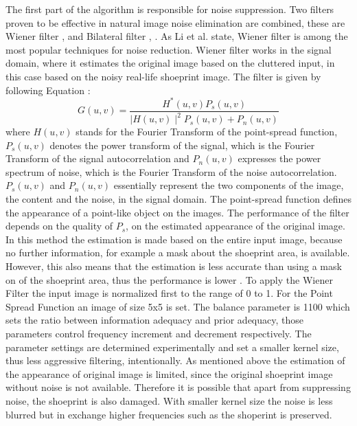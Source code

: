 \documentclass[draft,final]{vutinfth} %
\begin{document}
\par
The first part of the algorithm is responsible for noise suppression.
Two filters proven to be effective in natural image noise elimination are combined, these are Wiener filter \cite{li2014rapid}, \cite{chatterjee2011patch} and Bilateral filter \cite{zhang2016simultaneous}, \cite{huang2013self}.
As Li et al. \cite{li2014rapid} state, Wiener filter is among the most popular techniques for noise reduction.
Wiener filter works in the signal domain, where it estimates the original image based on the cluttered input, in this case based on the noisy real-life shoeprint image. 
The filter is given by following Equation \cite{Win}:
\begin{equation}
G(u, v) = \frac{H^*(u,v) P_s(u, v)}{\mid H(u,v)\mid ^2 P_s (u, v) + P_n (u, v)}  
\end{equation}
where $H(u,v)$ stands for the Fourier Transform of the point-spread function, $P_s (u,v)$ denotes the power transform of the signal, which is the Fourier Transform of the signal autocorrelation and $P_n(u,v)$ expresses the power spectrum of noise, which is the Fourier Transform of the noise autocorrelation.
 $P_s(u,v)$ and  $P_n(u,v)$ essentially represent the two components of the image, the content and the noise, in the signal domain.
The point-spread function defines the appearance of a point-like object on the images.
The performance of the filter depends on the quality of $P_s$, on the estimated appearance of the original image.
In this method the estimation is made based on the entire input image, because no further information, for example a mask about the shoeprint  area, is available.
However, this also means that the estimation is less accurate than using a mask on of the shoeprint area, thus the performance is lower \cite{chatterjee2011patch}.
To apply the Wiener Filter the input image is normalized first to the range of 0 to 1.
For the Point Spread Function an image of size 5x5 is set.
The balance parameter is 1100 which sets the ratio between information adequacy and prior adequacy, those parameters control frequency increment and decrement respectively.
The parameter settings are determined experimentally and set a smaller kernel size, thus less aggressive filtering, intentionally.
As mentioned above the estimation of the appearance of original image is limited, since the original shoeprint image without noise is not available.
Therefore it is possible that apart from suppressing noise, the shoeprint is also damaged.
With smaller kernel size the noise is less blurred but in exchange higher frequencies such as the shoperint is preserved.
\end{document}

